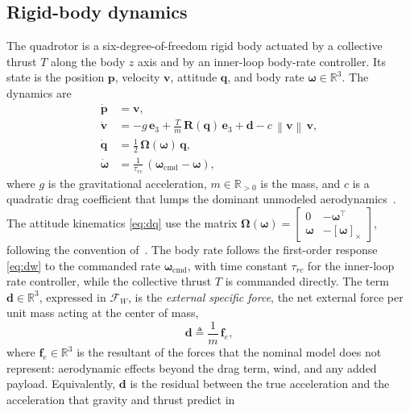 \documentclass{ieeeaccess}
\newcommand{\R}{\mathbb{R}}
\newcommand{\norm}[1]{\left\| #1 \right\|}
\newcommand{\vect}[1]{\bm{#1}}
\newcommand{\mat}[1]{\mathbf{#1}}
\begin{document}
\subsection{Rigid-body dynamics}
The quadrotor is a six-degree-of-freedom rigid body actuated by a collective
thrust $T$ along the body $z$ axis and by an inner-loop body-rate controller. Its
state is the position $\vect{p}$, velocity $\vect{v}$, attitude $\vect{q}$, and
body rate $\vect{\omega}\in\R^3$. The dynamics are
\begin{align}
\dot{\vect{p}} &= \vect{v}, \label{eq:dp}\\
\dot{\vect{v}} &= -g\,\vect{e}_3 + \frac{T}{m}\,\mat{R}(\vect{q})\,\vect{e}_3
                  + \vect{d} - c\,\norm{\vect{v}}\,\vect{v},
                  \label{eq:dv}\\
\dot{\vect{q}} &= \tfrac{1}{2}\,\mat{\Omega}(\vect{\omega})\,\vect{q},
                  \label{eq:dq}\\
\dot{\vect{\omega}} &= \tfrac{1}{\tau_{rc}}\,(\vect{\omega}_{\text{cmd}}-\vect{\omega}),
                  \label{eq:dw}
\end{align}
where $g$ is the gravitational acceleration, $m\in\R_{>0}$ is the mass, and $c$
is a quadratic drag coefficient that lumps the dominant unmodeled
aerodynamics~\cite{sun2022comparative}. The attitude kinematics \eqref{eq:dq} use
the matrix
$\mat{\Omega}(\vect{\omega})=\left[\begin{smallmatrix}0 & -\vect{\omega}^{\!\top}\\[2pt] \vect{\omega} & -[\vect{\omega}]_\times\end{smallmatrix}\right]$,
following the convention of~\cite{shuster1993survey,barfoot2017state}. The body rate follows the
first-order response \eqref{eq:dw} to the commanded rate
$\vect{\omega}_{\text{cmd}}$, with time constant $\tau_{rc}$ for the inner-loop
rate controller, while the collective thrust $T$ is commanded directly. The term
$\vect{d}\in\R^3$, expressed in $\mathcal{F}_W$, is the \textit{external
specific force}, the net external force per unit mass acting at the center of
mass,
\begin{equation}
\vect{d}\triangleq \frac{1}{m}\,\vect{f}_e ,
\label{eq:dfdef}
\end{equation}
where $\vect{f}_e\in\R^3$ is the resultant of the forces that the nominal model
does not represent: aerodynamic effects beyond the drag term, wind, and any
added payload. Equivalently, $\vect{d}$ is the residual between the true
acceleration and the acceleration that gravity and thrust predict in
\end{document}
